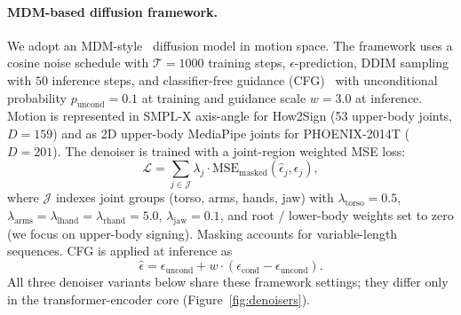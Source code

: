 \documentclass{article}
\begin{document}
\paragraph{MDM-based diffusion framework.}
We adopt an MDM-style~\citep{tevet2023human} diffusion model in motion space. The framework uses a cosine noise schedule with $\mathcal{T}=1000$ training steps, $\epsilon$-prediction, DDIM sampling~\citep{song2021denoising} with $50$ inference steps, and classifier-free guidance (CFG)~\citep{ho2022classifier} with unconditional probability $p_{\text{uncond}}=0.1$ at training and guidance scale $w=3.0$ at inference. Motion is represented in SMPL-X axis-angle for How2Sign (53 upper-body joints, $D=159$) and as 2D upper-body MediaPipe joints for PHOENIX-2014T ($D=201$). The denoiser is trained with a joint-region weighted MSE loss:
\begin{equation}
    \mathcal{L} = \sum_{j \in \mathcal{J}} \lambda_j \cdot \text{MSE}_\text{masked}(\hat{\epsilon}_j, \epsilon_j),
\end{equation}
where $\mathcal{J}$ indexes joint groups (torso, arms, hands, jaw) with $\lambda_\text{torso}=0.5$, $\lambda_\text{arms}=\lambda_\text{lhand}=\lambda_\text{rhand}=5.0$, $\lambda_\text{jaw}=0.1$, and root / lower-body weights set to zero (we focus on upper-body signing). Masking accounts for variable-length sequences. CFG is applied at inference as
\begin{equation}
    \hat{\epsilon} = \epsilon_{\text{uncond}} + w \cdot (\epsilon_{\text{cond}} - \epsilon_{\text{uncond}}).
\end{equation}
All three denoiser variants below share these framework settings; they differ only in the transformer-encoder core (Figure~\ref{fig:denoisers}).
\end{document}
